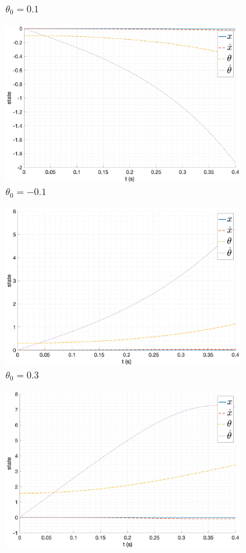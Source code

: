 \begin{figure}[ht!]
\begin{subfigure}[b]{0.45\textwidth}
        \caption{$\theta_0 = 0.1$}
    \end{subfigure}
    \begin{subfigure}[b]{0.45\textwidth}
        \includegraphics[width=\textwidth]{media/plots/free_motion/state_3.png}
        \caption{$\theta_0 = -0.1$}
    \end{subfigure}
    \begin{subfigure}[b]{0.45\textwidth}
        \includegraphics[width=\textwidth]{media/plots/free_motion/state_4.png}
        \caption{$\theta_0 = 0.3$}
    \end{subfigure}
    \begin{subfigure}[b]{0.45\textwidth}
        \includegraphics[width=\textwidth]{media/plots/free_motion/state_5.png}

\end{subfigure}
\end{figure}
